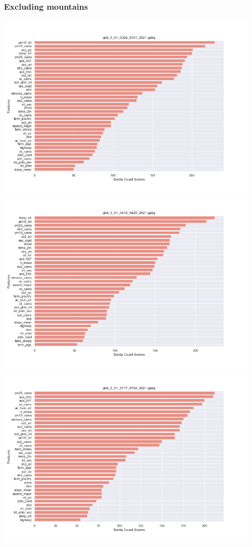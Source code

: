 \subsubsection{Excluding mountains}
\begin{center}
\includegraphics[width=.9\textwidth]{images/fs_results/pm25/001/no_montains/grid_0_01_0324_0331_2021.png}
\includegraphics[width=.9\textwidth]{images/fs_results/pm25/001/no_montains/grid_0_01_0418_0425_2021.png}
\includegraphics[width=.9\textwidth]{images/fs_results/pm25/001/no_montains/grid_0_01_0717_0724_2021.png}

\end{center}
